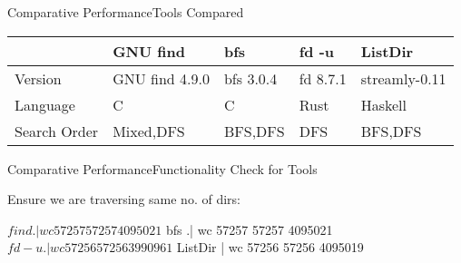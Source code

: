 \documentclass[17pt]{beamer}
\begin{document}
\begin{frame}{Comparative Performance}{Tools Compared}
\scriptsize


\begin{tabular}{|l|l|l|l|l|}
\hline
  & GNU find & bfs & fd -u & ListDir \\
\hline
  Version & GNU find 4.9.0 & bfs 3.0.4 & fd 8.7.1 & streamly-0.11 \\
\hline
  Language & C & C & Rust & Haskell \\
\hline
  Search Order & Mixed,DFS & BFS,DFS & DFS & BFS,DFS \\
\hline
\end{tabular}
\end{frame}

\begin{frame}[fragile]{Comparative Performance}{Functionality Check for Tools}

Ensure we are traversing same no. of dirs:
\begin{code}
  $ find .| wc
  57257   57257 4095021
  $ bfs .| wc
  57257   57257 4095021
  $ fd -u .| wc
  57256   57256 3990961
  $ ListDir | wc
  57256   57256 4095019
\end{code}
\end{frame}
\end{document}
